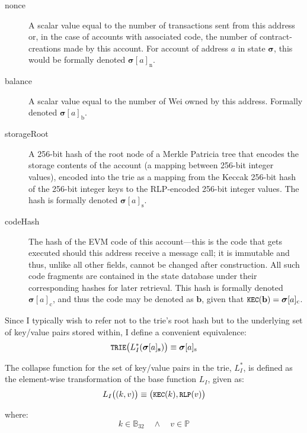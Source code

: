 \documentclass[9pt,oneside]{amsart}
\makeatletter
\newcommand{\linkdest}[1]{\Hy@raisedlink{\hypertarget{#1}{}}}
\makeatother
\begin{document}
\begin{multicols}{2}
\begin{description}
\item[nonce] \linkdest{account_nonce}A scalar value equal to the number of transactions sent from this address or, in the case of accounts with associated code, the number of contract-creations made by this account. For account of address $a$ in state $\boldsymbol{\sigma}$, this would be formally denoted $\boldsymbol{\sigma}[a]_{\mathrm{n}}$.
\item[balance] A scalar value equal to the number of Wei owned by this address. Formally denoted $\boldsymbol{\sigma}[a]_{\mathrm{b}}$.
\item[storageRoot] A 256-bit hash of the root node of a Merkle Patricia tree that encodes the storage contents of the account (a mapping between 256-bit integer values), encoded into the trie as a mapping from the Keccak 256-bit hash of the  256-bit integer keys to the RLP-encoded 256-bit integer values. The hash is formally denoted $\boldsymbol{\sigma}[a]_{\mathrm{s}}$.
\item[codeHash] The hash of the EVM code of this account---this is the code that gets executed should this address receive a message call; it is immutable and thus, unlike all other fields, cannot be changed after construction. All such code fragments are contained in the state database under their corresponding hashes for later retrieval. This hash is formally denoted $\boldsymbol{\sigma}[a]_{\mathrm{c}}$, and thus the code may be denoted as $\mathbf{b}$, given that $\texttt{\small KEC}(\mathbf{b}) = \boldsymbol{\sigma}[a]_{\mathrm{c}}$.
\end{description}

Since I typically wish to refer not to the trie's root hash but to the underlying set of key/value pairs stored within, I define a convenient equivalence:
\begin{equation}
\texttt{\small TRIE}\big(L_{I}^*(\boldsymbol{\sigma}[a]_{\mathbf{s}})\big) \equiv \boldsymbol{\sigma}[a]_{\mathrm{s}}
\end{equation}

The collapse function for the set of key/value pairs in the trie, $L_{I}^*$, is defined as the element-wise transformation of the base function $L_{I}$, given as:
\begin{equation}
L_{I}\big( (k, v) \big) \equiv \big(\texttt{\small KEC}(k), \texttt{\small RLP}(v)\big)
\end{equation}

where:
\begin{equation}
k \in \mathbb{B}_{32} \quad \wedge \quad v \in \mathbb{P}
\end{equation}


\end{multicols}
\end{document}
